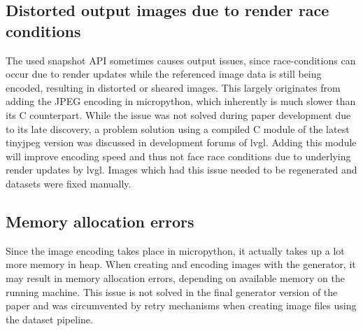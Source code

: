 \documentclass[Bachelor, BIC, english, fhCitStyle, IEEE]{BASE/twbook} %
\newcommand{\nocontentsline}[3]{}
\newcommand{\hidsubsection}[1]{\bgroup\let\addcontentsline=\nocontentsline\subsection{#1}\egroup}
\begin{document}
\clearpage
\hidsubsection{Distorted output images due to render race conditions}
The used snapshot API sometimes causes output issues, since race-conditions can occur due to render updates while the referenced image data is still being encoded, resulting in distorted or sheared images. This largely originates from adding the JPEG encoding in micropython, which inherently is much slower than its C counterpart. While the issue was not solved during paper development due to its late discovery, a problem solution using a compiled C module of the latest tinyjpeg version was discussed in development forums of \ac{lvgl}. Adding this module will improve encoding speed and thus not face race conditions due to underlying render updates by \ac{lvgl}. Images which had this issue needed to be regenerated and datasets were fixed manually.
\hidsubsection{Memory allocation errors}
Since the image encoding takes place in micropython, it actually takes up a lot more memory in heap. When creating and encoding images with the generator, it may result in memory allocation errors, depending on available memory on the running machine. This issue is not solved in the final generator version of the paper and was circumvented by retry mechanisms when creating image files using the dataset pipeline.
\end{document}
